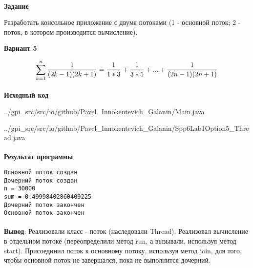 \documentclass[12pt, a4paper, simple]{eskdtext}
\begin{document}
    
    
    \paragraph{}\textbf{Задание}
    
    Разработать консольное приложение с двумя потоками (1 - основной поток; 2 - поток, в котором производится вычисление).

    \begin{center}
        \textbf{Вариант 5}
    \end{center}

    $$\sum_{k=1}^n {1 \over (2k-1) (2k + 1)} = {1 \over 1 * 3} + {1 \over 3 * 5} + ... + {1 \over (2n-1) (2n + 1)}$$

    \paragraph{}\textbf{Исходный код}

    
        {../gpi_src/src/io/github/Pavel_Innokentevich_Galanin/Main.java}
    
        {../gpi_src/src/io/github/Pavel_Innokentevich_Galanin/Spp6Lab1Option5_Thread.java}

    \paragraph{}\textbf{Результат программы}

\begin{lstlisting}[name=Результат программы]
Основной поток создан
Дочерний поток создан
n = 30000
sum = 0.49998402860409225
Дочерний поток закончен
Основной поток закончен
\end{lstlisting}

    \paragraph{}\textbf{Вывод}: Реализовали класс - поток (наследовали Thread).
    Реализовал вычисление в отдельном потоке (переопределили метод run, а вызывали, используя метод start).
    Присоединил поток к основному потоку, используя метод join, для того, чтобы основной поток не завершался, пока не выполнится дочерний.

\end{document}
